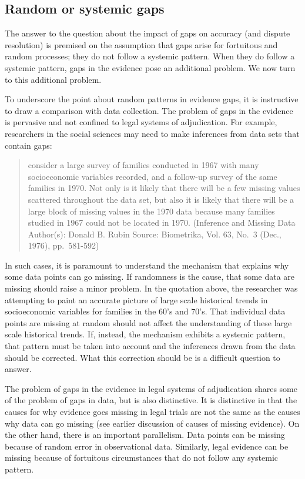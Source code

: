 \documentclass[
  10pt,
  dvipsnames,enabledeprecatedfontcommands]{scrartcl}
\begin{document}
\hypertarget{random-or-systemic-gaps}{%
\subsection{Random or systemic gaps}\label{random-or-systemic-gaps}}

The answer to the question about the impact of gaps on accuracy (and
dispute resolution) is premised on the assumption that gaps arise for
fortuitous and random processes; they do not follow a systemic pattern.
When they do follow a systemic pattern, gaps in the evidence pose an
additional problem. We now turn to this additional problem.

To underscore the point about random patterns in evidence gaps, it is
instructive to draw a comparison with data collection. The problem of
gaps in the evidence is pervasive and not confined to legal systems of
adjudication. For example, researchers in the social sciences may need
to make inferences from data sets that contain gaps:

\begin{quote}
consider a large survey of families conducted in 1967 with many
socioeconomic variables recorded, and a follow-up survey of the same
families in 1970. Not only is it likely that there will be a few missing
values scattered throughout the data set, but also it is likely that
there will be a large block of missing values in the 1970 data because
many families studied in 1967 could not be located in 1970. (Inference
and Missing Data Author(s): Donald B. Rubin Source: Biometrika, Vol. 63,
No.~3 (Dec., 1976), pp.~581-592)
\end{quote}

In such cases, it is paramount to understand the mechanism that explains
why some data points can go missing. If randomness is the cause, that
some data are missing should raise a minor problem. In the quotation
above, the researcher was attempting to paint an accurate picture of
large scale historical trends in socioeconomic variables for families in
the 60's and 70's. That individual data points are missing at random
should not affect the understanding of these large scale historical
trends. If, instead, the mechanism exhibits a systemic pattern, that
pattern must be taken into account and the inferences drawn from the
data should be corrected. What this correction should be is a difficult
question to answer.

The problem of gaps in the evidence in legal systems of adjudication
shares some of the problem of gaps in data, but is also distinctive. It
is distinctive in that the causes for why evidence goes missing in legal
trials are not the same as the causes why data can go missing (see
earlier discussion of causes of missing evidence). On the other hand,
there is an important parallelism. Data points can be missing because of
random error in observational data. Similarly, legal evidence can be
missing because of fortuitous circumstances that do not follow any
systemic pattern.
\end{document}
